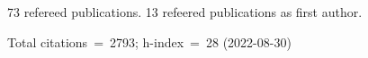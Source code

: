 73 refereed publications. 13 refeered publications as first author.

Total citations~=~2793; h-index~=~28 (2022-08-30)